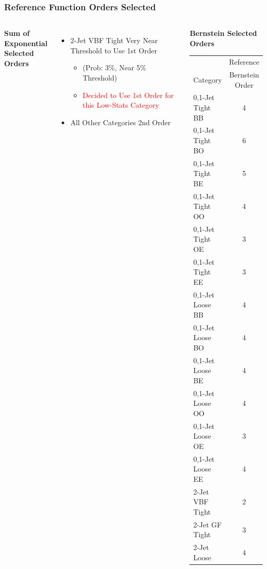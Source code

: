 \documentclass{beamer}
\newcommand{\tred}[1]{\textcolor{red}{#1}}
\begin{document}
\begin{frame}
\frametitle{Reference Function Orders Selected}
\vspace{-1em}
\begin{columns}[c]
 \column{60mm}
    \begin{center}
      \textbf{Sum of Exponential \\ Selected Orders }
    \end{center}
    \begin{itemize}
      \item 2-Jet VBF Tight Very Near Threshold to Use 1st Order
      \begin{itemize}
        \item {\scriptsize (Prob: 3\%, Near 5\% Threshold)}
        \item \tred{Decided to Use 1st Order for this Low-Stats Category}
      \end{itemize}
      \item All Other Categories 2nd Order
    \end{itemize}
 \column{60mm}
    \begin{center}
      \textbf{Bernstein Selected Orders}
      \scriptsize
      \begin{tabular}{|l|c|} \hline
                             & Reference       \\
        Category             & Bernstein Order \\ \hline \hline
        0,1-Jet Tight BB     & 4       \\ \hline
        0,1-Jet Tight BO     & 6       \\ \hline
        0,1-Jet Tight BE     & 5       \\ \hline
        0,1-Jet Tight OO     & 4       \\ \hline
        0,1-Jet Tight OE     & 3       \\ \hline
        0,1-Jet Tight EE     & 3       \\ \hline
        0,1-Jet Loose BB     & 4       \\ \hline
        0,1-Jet Loose BO     & 4       \\ \hline
        0,1-Jet Loose BE     & 4       \\ \hline
        0,1-Jet Loose OO     & 4       \\ \hline
        0,1-Jet Loose OE     & 3       \\ \hline
        0,1-Jet Loose EE     & 4       \\ \hline
        2-Jet VBF Tight      & 2       \\ \hline
        2-Jet GF Tight       & 3       \\ \hline
        2-Jet Loose          & 4       \\ \hline
      \end{tabular}
    \small
    \end{center}
\end{columns}
\end{frame}
\end{document}
